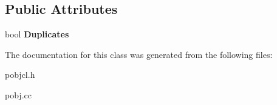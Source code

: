 \subsection*{Public Attributes}
\begin{DoxyCompactItemize}
\item 
\hypertarget{classcl__sorted__list_a36a95023a06dd3ce8d0977daac39d175}{
bool {\bfseries Duplicates}}
\label{classcl__sorted__list_a36a95023a06dd3ce8d0977daac39d175}

\end{DoxyCompactItemize}


The documentation for this class was generated from the following files:\begin{DoxyCompactItemize}
\item 
pobjcl.h\item 
pobj.cc\end{DoxyCompactItemize}
